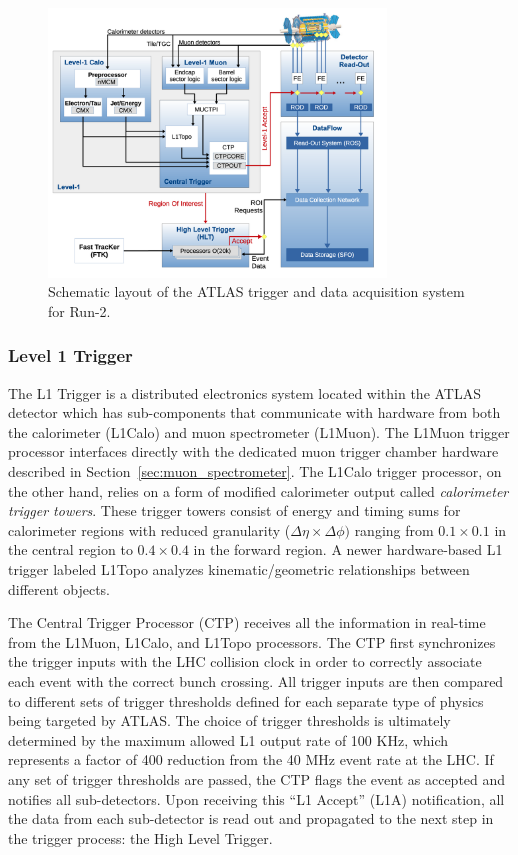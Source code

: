 \begin{figure}
	\centering
	\includegraphics[width=0.8\textwidth]{atlas_trigger_system}
	\caption{Schematic layout of the ATLAS trigger and data acquisition system for Run-2. \cite{Ruiz-Martinez:2133909}}
	\label{fig:trigger_system}
\end{figure}

\subsubsection{Level 1 Trigger}
The L1 Trigger is a distributed electronics system located within the ATLAS detector which has sub-components that communicate with hardware from both the calorimeter (L1Calo) and muon spectrometer (L1Muon).
The L1Muon trigger processor interfaces directly with the dedicated muon trigger chamber hardware described in Section~\ref{sec:muon_spectrometer}.
The L1Calo trigger processor, on the other hand, relies on a form of modified calorimeter output called \textit{calorimeter trigger towers}.
These trigger towers consist of energy and timing sums for calorimeter regions with reduced granularity ($\Delta \eta \times \Delta \phi)$ ranging from $0.1 \times 0.1$ in the central region to $0.4 \times 0.4$ in the forward region.
A newer hardware-based L1 trigger labeled L1Topo analyzes kinematic/geometric relationships between different objects.

The Central Trigger Processor (CTP) receives all the information in real-time from the L1Muon, L1Calo, and L1Topo processors.
The CTP first synchronizes the trigger inputs with the LHC collision clock in order to correctly associate each event with the correct bunch crossing.
All trigger inputs are then compared to different sets of trigger thresholds defined for each separate type of physics being targeted by ATLAS.
The choice of trigger thresholds is ultimately determined by the maximum allowed L1 output rate of 100 KHz, which represents a factor of 400 reduction from the 40 MHz event rate at the LHC.
If any set of trigger thresholds are passed, the CTP flags the event as accepted and notifies all sub-detectors.
Upon receiving this ``L1 Accept'' (L1A) notification, all the data from each sub-detector is read out and propagated to the next step in the trigger process: the High Level Trigger.

